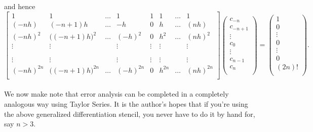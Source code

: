 \documentclass[paper=a4, fontsize=11pt]{scrartcl} %
\numberwithin{equation}{section} %
\numberwithin{figure}{section} %
\numberwithin{table}{section} %
\begin{document}
and hence \\

$$\left[ \begin{array}{cccccccc}
1            &                      1                        &        \hdots &   1              &     1         &     1          & \hdots   &    1       \\
(-nh)      &                (-n+1)h                    &        \hdots &  -h             &     0         &     h          & \hdots  &  (nh)   \\
(-nh)^2  &   \bigg((-n+1)h\bigg)^2        &        \hdots &  (-h)^2      &     0         &     h^2     &  \hdots   &  (nh)^2   \\
\vdots   &                   \vdots 	         &         	    &   \vdots     & \vdots     & \vdots     &               &  \vdots   \\
	    &						&   	             &		      &		      &		        &		     &      \\	
	    &						 &   	             &		      &		      &		        &		     &      \\	
\vdots    &                   \vdots 		 &         	    &   \vdots     & \vdots     & \vdots      &               &  \vdots   \\
(-nh)^{2n} &  \bigg((-n+1)h\bigg)^{2n}   &      \hdots &  (-h)^{2n}  &     0         &     h^{2n}  & \hdots   &  (nh)^{2n}   \\
\end{array} \right] %
%
\left( \begin{array}{c}
c_{-n} \\
c_{-n+1} \\
\vdots \\ 
c_{0} \\
\vdots \\
c_{n-1} \\
c_{n} \\
\end{array} \right) =   
%
\left( \begin{array}{c}
1 \\
0 \\
\vdots \\
0\\
\vdots \\
0\\
(2n)! \\
\end{array} \right).$$\\

We now make note that error analysis can be completed in a completely analogous way using Taylor Series. It is the author's hopes that if you're using the above generalized differentiation stencil, you never have to do it by hand for, say $n>3$. \smiley \\
\end{document}
